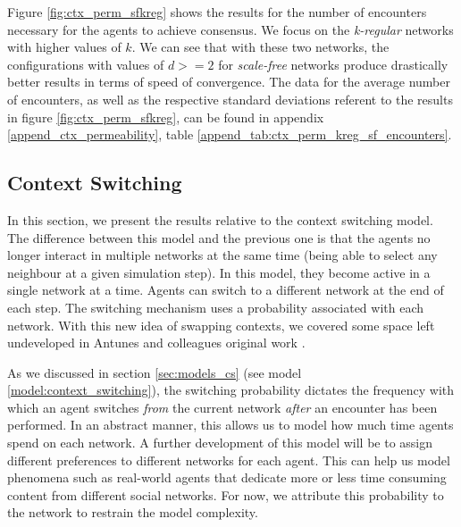 \documentclass[preprint,number]{elsarticle}
\begin{document}
      Figure \ref{fig:ctx_perm_sfkreg} shows the results for the number of encounters necessary for
      the agents to achieve consensus. We focus on the \textit{k-regular} networks with higher
      values of $k$. We can see that with these two networks, the configurations with values of
      $d>=2$ for \textit{scale-free} networks produce drastically better results in terms of speed
      of convergence. The data for the average number of encounters, as well as the respective
      standard deviations referent to the results in figure \ref{fig:ctx_perm_sfkreg}, can be found
      in appendix \ref{append_ctx_permeability}, table \ref{append_tab:ctx_perm_kreg_sf_encounters}.


      
      \subsection{Context Switching}
      \noindent In this section, we present the results relative to the context switching model. The
      difference between this model and the previous one is that the agents no longer interact in
      multiple networks at the same time (being able to select any neighbour at a given simulation
      step). In this model, they become active in a single network at a time. Agents can switch to a
      different network at the end of each step. The switching mechanism uses a probability
      associated with each network. With this new idea of swapping contexts, we covered some space
      left undeveloped in Antunes and colleagues original work \cite{Antunes2007,Antunes2010}.

      As we discussed in section \ref{sec:models_cs} (see model \ref{model:context_switching}), the
      switching probability dictates the frequency with which an agent switches \textit{from} the
      current network \textit{after} an encounter has been performed. In an abstract manner, this
      allows us to model how much time agents spend on each network. A further development of this
      model will be to assign different preferences to different networks for each agent. This can
      help us model phenomena such as real-world agents that dedicate more or less time consuming
      content from different social networks. For now, we attribute this probability to the network
      to restrain the model complexity.
\end{document}
